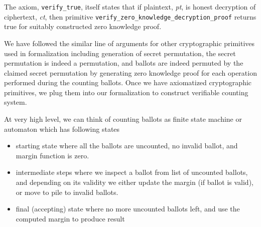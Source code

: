\documentclass{llncs}
\begin{document}
 The axiom, \texttt{verify\_true}, itself states that if plaintext, \textit{pt}, is honest
 decryption of ciphertext, \textit{ct}, then primitive
 \texttt{verify\_zero\_knowledge\_decryption\_proof} returns true for 
 suitably constructed zero knowledge proof.
 
 We have followed the similar line of 
 arguments for other cryptographic primitives used in formalization including generation
  of secret permutation, 
 the secret permutation is indeed a permutation, and ballots are indeed permuted by the
 claimed secret permutation by generating zero knowledge proof 
 for each operation performed during the counting ballots. Once we have axiomatized
  cryptographic primitives, we plug them into our 
 formalization to construct verifiable counting system. 
 
 At very high level, we can think of counting ballots as finite state machine or 
 automaton which has following states 
 \begin{itemize}
 \item starting state where all the ballots are uncounted, 
       no invalid ballot, and margin function is zero.
 \item intermediate steps where we inspect a ballot from list of uncounted ballots, 
 		and depending on its validity
       we either update the margin (if ballot is valid), or move to pile to 
       invalid ballots.
  \item final (accepting) state where no more uncounted ballots left, and use 
  		the computed margin to produce result  
 \end{itemize}
 
\end{document}

